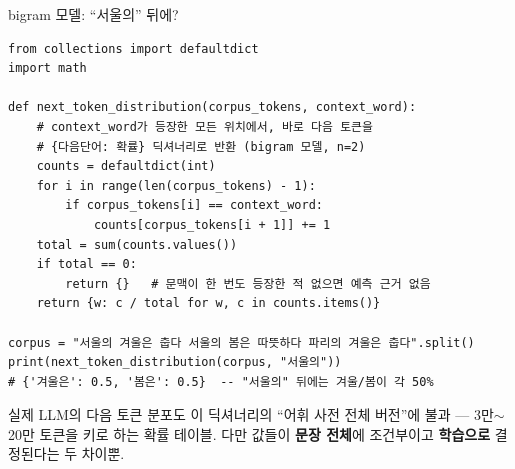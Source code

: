 \begin{frame}[fragile]{bigram 모델: ``서울의'' 뒤에?}
\begin{lstlisting}
from collections import defaultdict
import math

def next_token_distribution(corpus_tokens, context_word):
    # context_word가 등장한 모든 위치에서, 바로 다음 토큰을
    # {다음단어: 확률} 딕셔너리로 반환 (bigram 모델, n=2)
    counts = defaultdict(int)
    for i in range(len(corpus_tokens) - 1):
        if corpus_tokens[i] == context_word:
            counts[corpus_tokens[i + 1]] += 1
    total = sum(counts.values())
    if total == 0:
        return {}   # 문맥이 한 번도 등장한 적 없으면 예측 근거 없음
    return {w: c / total for w, c in counts.items()}

corpus = "서울의 겨울은 춥다 서울의 봄은 따뜻하다 파리의 겨울은 춥다".split()
print(next_token_distribution(corpus, "서울의"))
# {'겨울은': 0.5, '봄은': 0.5}  -- "서울의" 뒤에는 겨울/봄이 각 50%
\end{lstlisting}
  {\footnotesize 실제 LLM의 다음 토큰 분포도 이 딕셔너리의
  ``어휘 사전 전체 버전''에 불과 --- 3만$\sim$20만 토큰을 키로
  하는 확률 테이블. 다만 값들이 \textbf{문장 전체}에 조건부이고
  \textbf{학습으로} 결정된다는 두 차이뿐.}
\end{frame}
